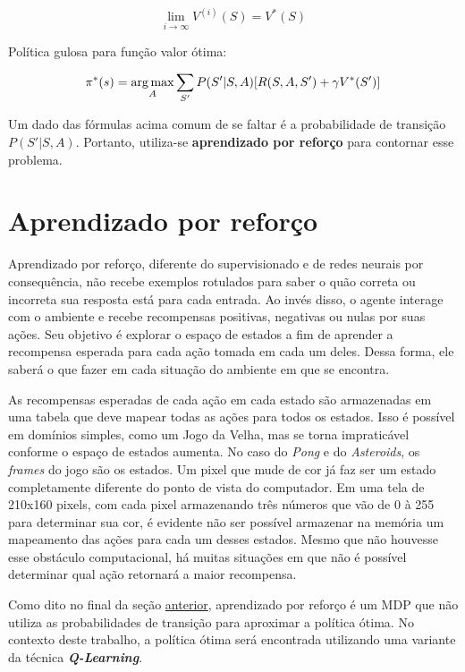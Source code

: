 \begin{equation} \label{eq:qvalue}
\lim_{i\to\infty} V^{(i)}(S) = V^{*}(S)
\end{equation}

Política gulosa para função valor ótima:

\begin{equation} \label{eq:opt_pol}
\pi^{*}(s) = \operatorname*{arg\,max}_{A}\sum_{S'}P(S'|S,A)[R(S,A,S') + \gamma V^{*}(S')]
\end{equation}

Um dado das fórmulas acima comum de se faltar é a probabilidade de transição $P(S'|S,A)$.
Portanto, utiliza-se \textbf{aprendizado por reforço} para contornar esse problema.


\section{Aprendizado por reforço}
\label{sec:rl}

Aprendizado por reforço, diferente do supervisionado e de redes neurais por consequência, não recebe exemplos rotulados para saber o quão correta ou incorreta sua resposta está para cada entrada.
Ao invés disso, o agente interage com o ambiente e recebe recompensas positivas, negativas ou nulas por suas ações.
Seu objetivo é explorar o espaço de estados a fim de aprender a recompensa esperada para cada ação tomada em cada um deles.
Dessa forma, ele saberá o que fazer em cada situação do ambiente em que se encontra.

As recompensas esperadas de cada ação em cada estado são armazenadas em uma tabela que deve mapear todas as ações para todos os estados.
Isso é possível em domínios simples, como um Jogo da Velha, mas se torna impraticável conforme o espaço de estados aumenta.
No caso do \textit{Pong} e do \textit{Asteroids}, os \textit{frames} do jogo são os estados.
Um pixel que mude de cor já faz ser um estado completamente diferente do ponto de vista do computador.
Em uma tela de 210x160 pixels, com cada pixel armazenando três números que vão de 0 à 255 para determinar sua cor, é evidente não ser possível armazenar na memória um mapeamento das ações para cada um desses estados.
Mesmo que não houvesse esse obstáculo computacional, há muitas situações em que não é possível determinar qual ação retornará a maior recompensa.

Como dito no final da seção \hyperref[sec:mdp]{anterior}, aprendizado por reforço é um MDP que não utiliza as probabilidades de transição para aproximar a política ótima.
No contexto deste trabalho, a política ótima será encontrada utilizando uma variante da técnica \textit{\textbf{Q-Learning}}.

